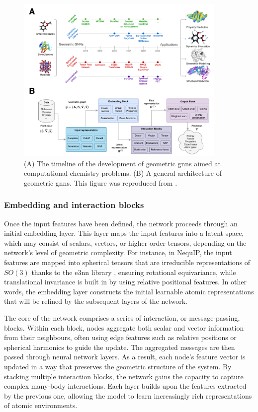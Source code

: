 \begin{figure}[t!]
    \centering
    \includegraphics[width=0.9\textwidth]{Figures/2_Theory/equivariant_gnns.png}
    \caption{(A) The timeline of the development of geometric \acp{gnn} aimed at computational chemistry problems. (B) A general architecture of geometric \acp{gnn}. This figure was reproduced from \citep{duvalHitchhikersGuideGeometric2024}.}
    \label{fig:equivariant_gnns}
\end{figure}

\subsubsection{Embedding and interaction blocks}
Once the input features have been defined, the network proceeds through an initial embedding layer. This layer maps the input features into a latent space, which may consist of scalars, vectors, or higher-order tensors, depending on the network’s level of geometric complexity. For instance, in NequIP, the input features are mapped into spherical tensors that are irreducible representations of $SO(3)$ thanks to the e3nn library \citep{geigerE3nnEuclideanNeural2022}, ensuring rotational equivariance, while translational invariance is built in by using relative positional features. In other words, the embedding layer constructs the initial learnable atomic representations that will be refined by the subsequent layers of the network.

The core of the network comprises a series of interaction, or message-passing, blocks. Within each block, nodes aggregate both scalar and vector information from their neighbours, often using edge features such as relative positions or spherical harmonics to guide the update. The aggregated messages are then passed through neural network layers. As a result, each node's feature vector is updated in a way that preserves the geometric structure of the system. By stacking multiple interaction blocks, the network gains the capacity to capture complex many-body interactions. Each layer builds upon the features extracted by the previous one, allowing the model to learn increasingly rich representations of atomic environments.

